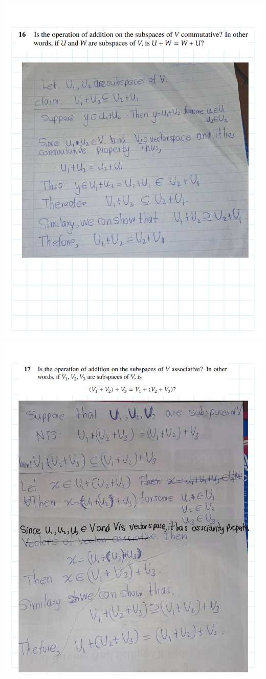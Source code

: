 \documentclass[
]{book}
\theoremstyle{definition}
\theoremstyle{definition}
\theoremstyle{definition}
\theoremstyle{definition}
\theoremstyle{remark}
\begin{document}
\begin{enumerate}
  \includegraphics{fig/Ex1C/Ex/Ex-18.png}
  \includegraphics{fig/Ex1C/Ex/Ex-19.png}

\end{enumerate}
\end{document}
